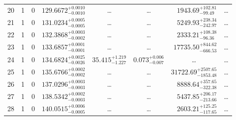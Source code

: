 \begin{table*}[!]
\begin{tabular}{llcrrlrc}
20 & 1 & 0 & $    129.6672_{-      0.0010}^{+      0.0010}$ & \multicolumn{1}{c}{\dots} & \multicolumn{1}{c}{\dots} & $     1943.69_{-       99.49}^{+      102.81}$ & \dots \\[1pt]
21 & 1 & 0 & $    131.0234_{-      0.0005}^{+      0.0005}$ & \multicolumn{1}{c}{\dots} & \multicolumn{1}{c}{\dots} & $     5249.93_{-      242.97}^{+      238.34}$ & \dots\\[1pt]
22 & 1 & 0 & $    132.3868_{-      0.0002}^{+      0.0003}$ & \multicolumn{1}{c}{\dots} & \multicolumn{1}{c}{\dots} & $     2333.21_{-       96.36}^{+      108.38}$ & \dots \\[1pt]
23 & 1 & 0 & $    133.6857_{-      0.0001}^{+      0.0001}$ & \multicolumn{1}{c}{\dots} & \multicolumn{1}{c}{\dots} & $    17735.50_{-      666.53}^{+      844.62}$ & \dots \\[1pt]
24 & 1 & 0 & $    134.6824_{-      0.0026}^{+      0.0025}$ & $      35.415_{-       1.227}^{+       1.219}$ & $       0.073_{-       0.007}^{+       0.006}$ & \multicolumn{1}{c}{\dots} & \dots \\[1pt]
25 & 1 & 0 & $    135.6766_{-      0.0002}^{+      0.0002}$ & \multicolumn{1}{c}{\dots} & \multicolumn{1}{c}{\dots} & $    31722.69_{-     1853.48}^{+     2507.65}$ & \dots \\[1pt]
26 & 1 & 0 & $    137.0296_{-      0.0003}^{+      0.0003}$ & \multicolumn{1}{c}{\dots} & \multicolumn{1}{c}{\dots} & $     8888.64_{-      322.38}^{+      357.65}$ & \dots \\[1pt]
27 & 1 & 0 & $    138.5342_{-      0.0003}^{+      0.0002}$ & \multicolumn{1}{c}{\dots} & \multicolumn{1}{c}{\dots} & $     5437.85_{-      213.66}^{+      206.17}$ & \dots \\[1pt]
28 & 1 & 0 & $    140.0515_{-      0.0005}^{+      0.0006}$ & \multicolumn{1}{c}{\dots} & \multicolumn{1}{c}{\dots} & $     2603.21_{-      117.65}^{+      125.25}$ & \dots \\[1pt]


\end{tabular}
\end{table*}
